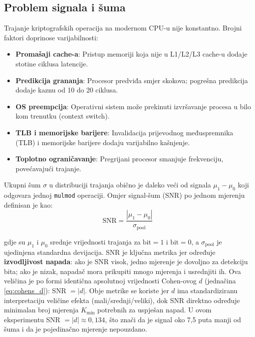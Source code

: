 \subsection{Problem signala i šuma}

Trajanje kriptografskih operacija na modernom CPU-u nije konstantno. Brojni faktori doprinose varijabilnosti:

\begin{itemize}
\item \textbf{Promašaji cache-a}: Pristup memoriji koja nije u L1/L2/L3 cache-u dodaje stotine ciklusa latencije.
\item \textbf{Predikcija grananja}: Procesor predviđa smjer skokova; pogrešna predikcija dodaje kaznu od 10 do 20 ciklusa.
\item \textbf{OS preempcija}: Operativni sistem može prekinuti izvršavanje procesa u bilo kom trenutku (context switch).
\item \textbf{TLB i memorijske barijere}: Invalidacija prijevodnog međuspremnika (TLB) i memorijske barijere dodaju varijabilno kašnjenje.
\item \textbf{Toplotno ograničavanje}: Pregrijani procesor smanjuje frekvenciju, povećavajući trajanje.
\end{itemize}

\noindent Ukupni šum $\sigma$ u distribuciji trajanja obično je daleko veći od signala $\mu_1 - \mu_0$ koji odgovara jednoj \texttt{mulmod} operaciji. Omjer signal-šum (SNR) po jednom mjerenju definisan je kao:
\begin{equation}
\text{SNR} = \frac{|\mu_1 - \mu_0|}{\sigma_{\text{pool}}}
\label{eq:snr}
\end{equation}

\noindent gdje su $\mu_1$ i $\mu_0$ srednje vrijednosti trajanja za $\text{bit}=1$ i $\text{bit}=0$, a $\sigma_{\text{pool}}$ je ujedinjena standardna devijacija. SNR je ključna metrika jer određuje \textbf{izvodljivost napada}: ako je SNR visok, jedno mjerenje je dovoljno za detekciju bita; ako je nizak, napadač mora prikupiti mnogo mjerenja i usrednjiti ih. Ova veličina je po formi identična apsolutnoj vrijednosti Cohen-ovog $d$ (jednačina \ref{eq:cohens_d}): SNR $= |d|$. Obje metrike se koriste jer $d$ ima standardiziranu interpretaciju veličine efekta (mali/srednji/veliki), dok SNR direktno određuje minimalan broj mjerenja $K_{\min}$ potrebnih za uspješan napad. U ovom eksperimentu SNR $= |d| \approx 0{,}134$, što znači da je signal oko 7,5 puta manji od šuma i da je pojedinačno mjerenje nepouzdano.

